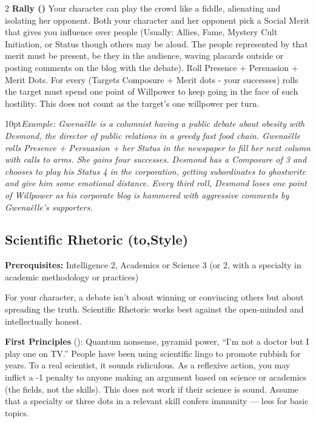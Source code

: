 \begin{multicols}{2}
\textbf{Rally (\textbullet\textbullet\textbullet\textbullet\textbullet)} Your character can play the crowd like a fiddle, alienating and isolating her opponent. Both your character and her opponent pick a Social Merit that gives you influence over people (Usually: Allies, Fame, Mystery Cult Initiation, or Status though others may be aloud. The people represented by that merit must be present, be they in the audience, waving placards outside or posting comments on the blog with the debate). Roll Presence + Persuasion + Merit Dots. For every (Targets Composure + Merit dots - your successes) rolls the target must spend one point of Willpower to keep going in the face of such hostility. This does not count as the target's one willpower per turn.

\begin{myindentpar}{10pt}\textit{Example: Gwena\"{e}lle is a columnist having a public debate about obesity with Desmond, the director of public relations in a greedy fast food chain. Gwena\"{e}lle rolls Presence + Persuasion + her Status in the newspaper to fill her next column with calls to arms. She gains four successes. Desmond has a Composure of 3 and chooses to play his Status 4 in the corporation, getting subordinates to ghostwrite and give him some emotional distance. Every third roll, Desmond loses one point of Willpower as his corporate blog is hammered with aggressive comments by Gwena\"{e}lle's supporters.}\end{myindentpar}

\subsection*{Scientific Rhetoric (\textbullet\nobreak\hspace{.16667em}to\nobreak\hspace{.16667em}\textbullet\textbullet\textbullet\textbullet\textbullet,\nobreak\hspace{.16667em}Style)}

\textbf{Prerequisites:} Intelligence 2, Academics or Science 3 (or 2, with a specialty in academic methodology or practices)

For your character, a debate isn't about winning or convincing others but about spreading the truth. Scientific Rhetoric works best against the open-minded and intellectually honest. 

\textbf{First Principles} (\textbullet): Quantum nonsense, pyramid power, “I'm not a doctor but I play one on TV.” People have been using scientific lingo to promote rubbish for years. To a real scientist, it sounds ridiculous. As a reflexive action, you may inflict a -1 penalty to anyone making an argument based on science or academics (the fields, not the skills). This does not work if their science is sound. Assume that a specialty or three dots in a relevant skill confers immunity — less for basic topics.


\end{multicols}
